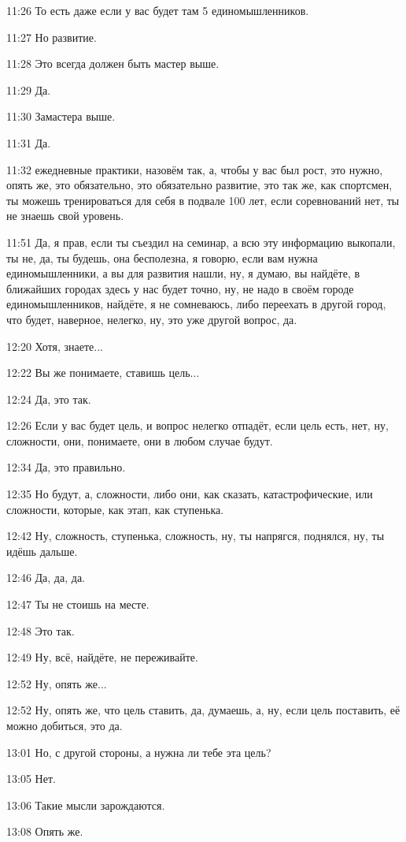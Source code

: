 11:26
То есть даже если у вас будет там 5 единомышленников.

11:27
Но развитие.

11:28
Это всегда должен быть мастер выше.

11:29
Да.

11:30
Замастера выше.

11:31
Да.

11:32
ежедневные практики, назовём так, а, чтобы у вас был рост, это нужно, опять же, это обязательно, это обязательно развитие, это так же, как спортсмен, ты можешь тренироваться для себя в подвале 100 лет, если соревнований нет, ты не знаешь свой уровень.

11:51
Да, я прав, если ты съездил на семинар, а всю эту информацию выкопали, ты не, да, ты будешь, она бесполезна, я говорю, если вам нужна единомышленники, а вы для развития нашли, ну, я думаю, вы найдёте, в ближайших городах здесь у нас будет точно, ну, не надо в своём городе единомышленников, найдёте, я не сомневаюсь, либо переехать в другой город, что будет, наверное, нелегко, ну, это уже другой вопрос, да.

12:20
Хотя, знаете...

12:22
Вы же понимаете, ставишь цель...

12:24
Да, это так.

12:26
Если у вас будет цель, и вопрос нелегко отпадёт, если цель есть, нет, ну, сложности, они, понимаете, они в любом случае будут.

12:34
Да, это правильно.

12:35
Но будут, а, сложности, либо они, как сказать, катастрофические, или сложности, которые, как этап, как ступенька.

12:42
Ну, сложность, ступенька, сложность, ну, ты напрягся, поднялся, ну, ты идёшь дальше.

12:46
Да, да, да.

12:47
Ты не стоишь на месте.

12:48
Это так.

12:49
Ну, всё, найдёте, не переживайте.

12:52
Ну, опять же...

12:52
Ну, опять же, что цель ставить, да, думаешь, а, ну, если цель поставить, её можно добиться, это да.

13:01
Но, с другой стороны, а нужна ли тебе эта цель?

13:05
Нет.

13:06
Такие мысли зарождаются.

13:08
Опять же.

